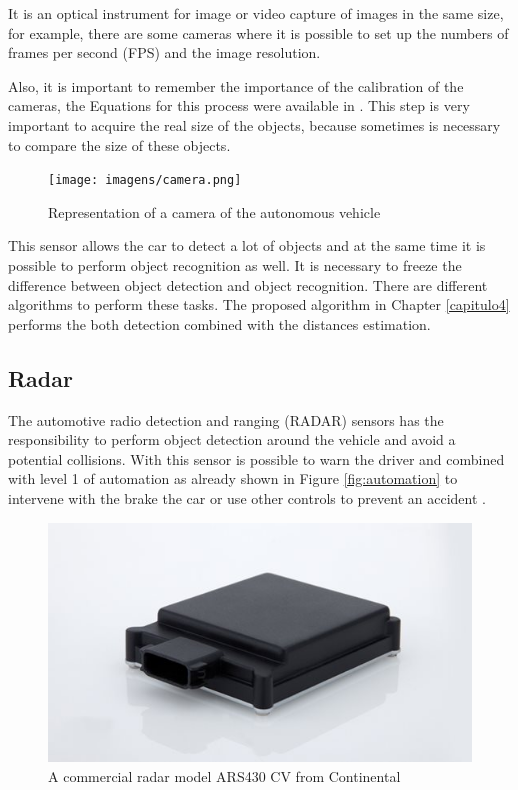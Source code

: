 It is an optical instrument for image or video capture of images in the same size, for example, there are some cameras where it is possible to set up the numbers of frames per second (FPS) and the image resolution. 

Also, it is important to remember the importance of the calibration of the cameras, the Equations for this process were available in \cite{888718}. This step is very important to acquire the real size of the objects, because sometimes is necessary to compare the size of these objects. 

\begin{figure}[H]
\centering
\texttt{[image: imagens/camera.png]}
\caption{Representation of a camera of the autonomous vehicle}
\label{fig:camera}
\end{figure}

This sensor allows the car to detect a lot of objects and at the same time it is possible to perform object recognition as well. It is necessary to freeze the difference between object detection and object recognition. There are different algorithms to perform these tasks. The proposed algorithm in Chapter \ref{capitulo4} performs the both detection combined with the distances estimation. 

\subsection{Radar}

The automotive radio detection and ranging (RADAR) sensors has the responsibility to perform object detection around the vehicle and avoid a potential collisions. With this sensor is possible to warn the driver and combined with level 1 of automation as already shown in Figure \ref{fig:automation} to intervene with the brake the car or use other controls to prevent an accident \cite{ariyur2006collision}.

\begin{figure}[H]
\centering
\includegraphics[width=\columnwidth]{imagens/radar.jpg}
\caption{A commercial radar model ARS430 CV from Continental}
\label{fig:camera}
\end{figure}

